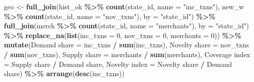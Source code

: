 \documentclass[
]{article}
\newenvironment{Shaded}{\begin{snugshade}}{\end{snugshade}}
\newcommand{\AttributeTok}[1]{\textcolor[rgb]{0.13,0.29,0.53}{#1}}
\newcommand{\DecValTok}[1]{\textcolor[rgb]{0.00,0.00,0.81}{#1}}
\newcommand{\FunctionTok}[1]{\textcolor[rgb]{0.13,0.29,0.53}{\textbf{#1}}}
\newcommand{\NormalTok}[1]{#1}
\newcommand{\OtherTok}[1]{\textcolor[rgb]{0.56,0.35,0.01}{#1}}
\newcommand{\SpecialCharTok}[1]{\textcolor[rgb]{0.81,0.36,0.00}{\textbf{#1}}}
\newcommand{\StringTok}[1]{\textcolor[rgb]{0.31,0.60,0.02}{#1}}
\begin{document}
\begin{Shaded}
\begin{Highlighting}[]
\NormalTok{geo }\OtherTok{\textless{}{-}} \FunctionTok{full\_join}\NormalTok{(hist\_ok }\SpecialCharTok{\%\textgreater{}\%} \FunctionTok{count}\NormalTok{(state\_id, }\AttributeTok{name =} \StringTok{"inc\_txns"}\NormalTok{),}
\NormalTok{                 new\_w   }\SpecialCharTok{\%\textgreater{}\%} \FunctionTok{count}\NormalTok{(state\_id, }\AttributeTok{name =} \StringTok{"nov\_txns"}\NormalTok{), }\AttributeTok{by =} \StringTok{"state\_id"}\NormalTok{) }\SpecialCharTok{\%\textgreater{}\%}
  \FunctionTok{full\_join}\NormalTok{(merch }\SpecialCharTok{\%\textgreater{}\%} \FunctionTok{count}\NormalTok{(state\_id, }\AttributeTok{name =} \StringTok{"merchants"}\NormalTok{), }\AttributeTok{by =} \StringTok{"state\_id"}\NormalTok{) }\SpecialCharTok{\%\textgreater{}\%}
  \FunctionTok{replace\_na}\NormalTok{(}\FunctionTok{list}\NormalTok{(}\AttributeTok{inc\_txns =} \DecValTok{0}\NormalTok{, }\AttributeTok{nov\_txns =} \DecValTok{0}\NormalTok{, }\AttributeTok{merchants =} \DecValTok{0}\NormalTok{)) }\SpecialCharTok{\%\textgreater{}\%}
  \FunctionTok{mutate}\NormalTok{(}\StringTok{\textasciigrave{}}\AttributeTok{Demand share}\StringTok{\textasciigrave{}}   \OtherTok{=}\NormalTok{ inc\_txns }\SpecialCharTok{/} \FunctionTok{sum}\NormalTok{(inc\_txns),}
         \StringTok{\textasciigrave{}}\AttributeTok{Novelty share}\StringTok{\textasciigrave{}}  \OtherTok{=}\NormalTok{ nov\_txns }\SpecialCharTok{/} \FunctionTok{sum}\NormalTok{(nov\_txns),}
         \StringTok{\textasciigrave{}}\AttributeTok{Supply share}\StringTok{\textasciigrave{}}   \OtherTok{=}\NormalTok{ merchants }\SpecialCharTok{/} \FunctionTok{sum}\NormalTok{(merchants),}
         \StringTok{\textasciigrave{}}\AttributeTok{Coverage index}\StringTok{\textasciigrave{}} \OtherTok{=} \StringTok{\textasciigrave{}}\AttributeTok{Supply share}\StringTok{\textasciigrave{}} \SpecialCharTok{/} \StringTok{\textasciigrave{}}\AttributeTok{Demand share}\StringTok{\textasciigrave{}}\NormalTok{,}
         \StringTok{\textasciigrave{}}\AttributeTok{Novelty index}\StringTok{\textasciigrave{}}  \OtherTok{=} \StringTok{\textasciigrave{}}\AttributeTok{Novelty share}\StringTok{\textasciigrave{}} \SpecialCharTok{/} \StringTok{\textasciigrave{}}\AttributeTok{Demand share}\StringTok{\textasciigrave{}}\NormalTok{) }\SpecialCharTok{\%\textgreater{}\%}
  \FunctionTok{arrange}\NormalTok{(}\FunctionTok{desc}\NormalTok{(inc\_txns))}


\end{Highlighting}
\end{Shaded}
\end{document}
